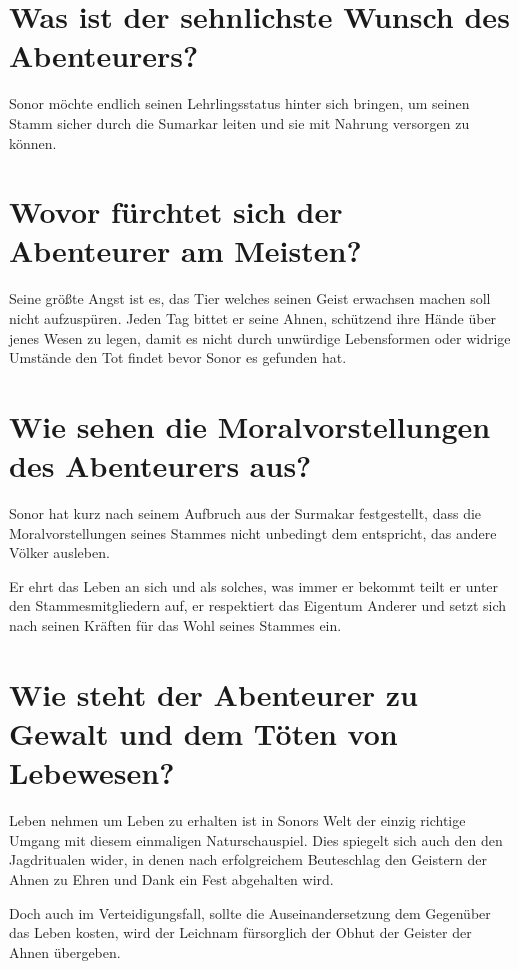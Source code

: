 \documentclass{article}
\begin{document}
	\section[Antrieb]{Was ist der sehnlichste Wunsch des Abenteurers?}

	Sonor möchte endlich seinen Lehrlingsstatus hinter sich bringen, um
	seinen Stamm sicher durch die Sumarkar leiten und sie mit Nahrung
	versorgen zu können.

	
	\section[Ängste]{Wovor fürchtet sich der Abenteurer am Meisten?}

	Seine größte Angst ist es, das Tier welches seinen Geist erwachsen
	machen soll nicht aufzuspüren. Jeden Tag bittet er seine Ahnen,
	schützend ihre Hände über jenes Wesen zu legen, damit es nicht durch
	unwürdige Lebensformen oder widrige Umstände den Tot findet bevor Sonor
	es gefunden hat.


	\section[Moral]{Wie sehen die Moralvorstellungen des Abenteurers aus?}
	

	Sonor hat kurz nach seinem Aufbruch aus der Surmakar festgestellt, dass
	die Moralvorstellungen seines Stammes nicht unbedingt dem entspricht,
	das andere Völker ausleben. 

	Er ehrt das Leben an sich und als solches, was immer er bekommt teilt er
	unter den Stammesmitgliedern auf, er respektiert das Eigentum Anderer
	und setzt sich nach seinen Kräften für das Wohl seines Stammes ein.


	\section[Frustrationstoleranz]{Wie steht der Abenteurer zu Gewalt und dem Töten von Lebewesen?}


	Leben nehmen um Leben zu erhalten ist in Sonors Welt der einzig richtige
	Umgang mit diesem einmaligen Naturschauspiel. Dies spiegelt sich auch
	den den Jagdritualen wider, in denen nach erfolgreichem Beuteschlag den
	Geistern der Ahnen zu Ehren und Dank ein Fest abgehalten wird.

	Doch auch im Verteidigungsfall, sollte die Auseinandersetzung dem
	Gegenüber das Leben kosten, wird der Leichnam fürsorglich der Obhut der
	Geister der Ahnen übergeben.
\end{document}

